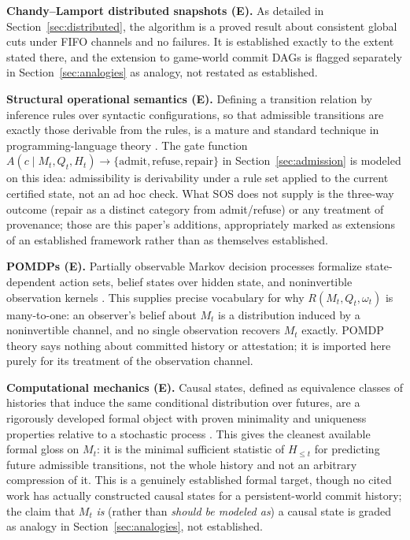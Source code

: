 \documentclass[11pt]{article}
\begin{document}
\textbf{Chandy--Lamport distributed snapshots (E).} As detailed in Section~\ref{sec:distributed}, the algorithm is a proved result about consistent global cuts under FIFO channels and no failures. It is established exactly to the extent stated there, and the extension to game-world commit DAGs is flagged separately in Section~\ref{sec:analogies} as analogy, not restated as established.

\textbf{Structural operational semantics (E).} Defining a transition relation by inference rules over syntactic configurations, so that admissible transitions are exactly those derivable from the rules, is a mature and standard technique in programming-language theory \cite{plotkin2004}. The gate function $A(c \mid M_t, Q_t, H_t) \to \{\mathrm{admit}, \mathrm{refuse}, \mathrm{repair}\}$ in Section~\ref{sec:admission} is modeled on this idea: admissibility is derivability under a rule set applied to the current certified state, not an ad hoc check. What SOS does not supply is the three-way outcome (repair as a distinct category from admit/refuse) or any treatment of provenance; those are this paper's additions, appropriately marked as extensions of an established framework rather than as themselves established.

\textbf{POMDPs (E).} Partially observable Markov decision processes formalize state-dependent action sets, belief states over hidden state, and noninvertible observation kernels \cite{kaelbling1998}. This supplies precise vocabulary for why $R(M_t, Q_t, \omega_t)$ is many-to-one: an observer's belief about $M_t$ is a distribution induced by a noninvertible channel, and no single observation recovers $M_t$ exactly. POMDP theory says nothing about committed history or attestation; it is imported here purely for its treatment of the observation channel.

\textbf{Computational mechanics (E).} Causal states, defined as equivalence classes of histories that induce the same conditional distribution over futures, are a rigorously developed formal object with proven minimality and uniqueness properties relative to a stochastic process \cite{shalizicrutchfield2001, crutchfieldyoung1989}. This gives the cleanest available formal gloss on $M_t$: it is the minimal sufficient statistic of $H_{\le t}$ for predicting future admissible transitions, not the whole history and not an arbitrary compression of it. This is a genuinely established formal target, though no cited work has actually constructed causal states for a persistent-world commit history; the claim that $M_t$ \emph{is} (rather than \emph{should be modeled as}) a causal state is graded as analogy in Section~\ref{sec:analogies}, not established.
\end{document}
